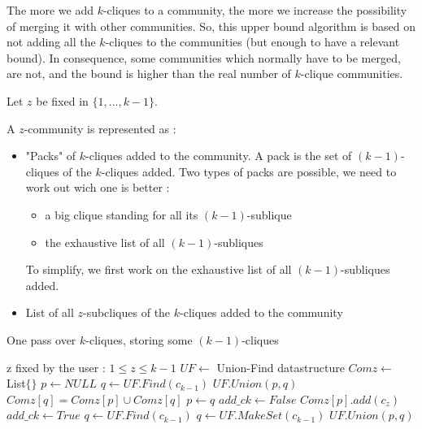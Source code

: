 The more we add $k$-cliques to a community, the more we increase the possibility of merging it with other communities. So, this upper bound algorithm is based on not adding all the $k$-cliques to the communities (but enough to have a relevant bound). In consequence, some communities which normally have to be merged, are not, and the bound is higher than the real number of $k$-clique communities.

Let $z$ be fixed in $\{1,...,k-1\}$.

A $z$-community is represented as :
\begin{itemize}
\item "Packs" of $k$-cliques added to the community. A pack is the set of $(k-1)$-cliques of the $k$-cliques added. Two types of packs are possible, we need to work out wich one is better :
  \begin{itemize}
  \item a big clique standing for all its $(k-1)$-sublique
  \item the exhaustive list of all $(k-1)$-subliques
  \end{itemize}

  To simplify, we first work on the exhaustive list of all $(k-1)$-subliques added.

\item List of all $z$-subcliques of the $k$-cliques added to the community 
\end{itemize}


\begin{algorithm}[!htbp]
  \caption{One pass over $k$-cliques, storing some $(k-1)$-cliques}
  \begin{algorithmic}[1]
    \State z fixed by the user : $1 \leq z \leq k-1$
    \State $UF \leftarrow$ Union-Find datastructure 
    \State $Comz \leftarrow$ List$\{\}$ 
    \State $p\leftarrow NULL$
    \State $q\leftarrow UF.Find(c_{k-1})$
    \State $UF.Union(p,q)$
    \State $Comz[q] = Comz[p] \cup Comz[q]$
    \EndIf
    \State $p \leftarrow q$
    \EndFor
    \State $add\_ck \leftarrow False$
    \State $Comz[p].add(c_z)$
    \State $add\_ck \leftarrow True$
    \EndIf
    \EndFor
    \State $q\leftarrow UF.Find(c_{k-1})$
    \State $q \leftarrow UF.MakeSet(c_{k-1})$
    \State $UF.Union(p,q)$
    \EndIf
    \EndFor
    \EndIf
    \EndFor
  \end{algorithmic}
\end{algorithm} 
